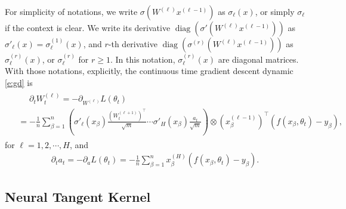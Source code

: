 \documentclass{article}
\numberwithin{equation}{section}
\DeclareMathOperator{\diag}{diag}
\renewcommand{\geq}{\geqslant}
\newcommand{\del}{\partial}
\newcommand{\1}{\mathds{1}}
\theoremstyle{plain} %
\begin{document}
For simplicity of notations, we write $\sigma(W^{(\ell)}x^{(\ell-1)})$ as $\sigma_\ell(x)$, or simply $\sigma_\ell$ if the context is clear. We write its derivative $\diag(\sigma'(W^{(\ell)}x^{(\ell-1)}))$ as $\sigma'_\ell(x)=\sigma_\ell^{(1)}(x)$, and $r$-th derivative $\diag(\sigma^{(r)}(W^{(\ell)}x^{(\ell-1)}))$ as $\sigma^{(r)}_\ell(x)$, or $\sigma^{(r)}_\ell$ for $r\geq 1$. In this notation, $\sigma^{(r)}_\ell(x)$ are diagonal matrices. With those notations, explicitly, the continuous time gradient descent dynamic \eqref{e:gd} is 
\begin{align}\begin{split}\label{e:derW}
&\phantom{{}={}}\del_t W^{(\ell)}_t
=- \del_{W^{(\ell)}}L(\theta_t)\\
&=- \frac{1}{n}\sum_{\beta=1}^n
\left(\sigma'_\ell(x_\beta)\frac{(W_t^{(\ell+1)})^\top}{\sqrt m}\cdots \sigma'_{H}(x_\beta)\frac{a_t}{\sqrt m}\right)
\otimes (x_\beta^{(\ell-1)})^{\top}(f(x_\beta,\theta_t)-y_\beta),
\end{split}\end{align}
for $\ell=1,2,\cdots, H$, and 
\begin{align}\label{e:dera}
\del_t a_t=- \del_{a}L(\theta_t)=- \frac{1}{n}\sum_{\beta =1}^n x_\beta^{(H)}(f(x_\beta,\theta_t)-y_\beta).
\end{align}





\subsection{Neural Tangent Kernel}
\end{document}
